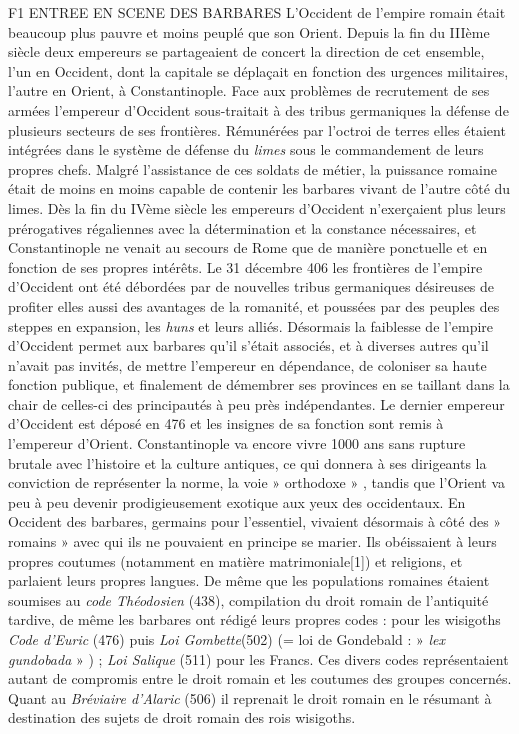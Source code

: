 F1 ENTREE EN SCENE DES BARBARES
 L'Occident de l'empire romain était beaucoup plus pauvre et moins peuplé que son Orient. Depuis la fin du IIIème siècle deux empereurs se partageaient de concert la direction de cet ensemble, l'un en Occident, dont la capitale se déplaçait en fonction des urgences militaires, l'autre en Orient, à Constantinople. 
 Face aux problèmes de recrutement de ses armées l'empereur d'Occident sous-traitait à des tribus germaniques la défense de plusieurs secteurs de ses frontières. Rémunérées par l'octroi de terres elles étaient intégrées dans le système de défense du \emph{limes} sous le commandement de leurs propres chefs. Malgré l'assistance de ces soldats de métier, la puissance romaine était de moins en moins capable de contenir les barbares vivant de l'autre côté du limes. Dès la fin du IVème siècle les empereurs d'Occident n'exerçaient plus leurs prérogatives régaliennes avec la détermination et la constance nécessaires, et Constantinople ne venait au secours de Rome que de manière ponctuelle et en fonction de ses propres intérêts. Le 31 décembre 406 les frontières de l'empire d'Occident ont été débordées par de nouvelles tribus germaniques désireuses de profiter elles aussi des avantages de la romanité, et poussées par des peuples des steppes en expansion, les \emph{huns} et leurs alliés.
 Désormais la faiblesse de l'empire d'Occident permet aux barbares qu'il s'était associés, et à diverses autres qu'il n'avait pas invités, de mettre l'empereur en dépendance, de coloniser sa haute fonction publique, et finalement de démembrer ses provinces en se taillant dans la chair de celles-ci des principautés à peu près indépendantes. Le dernier empereur d'Occident est déposé en 476 et les insignes de sa fonction sont remis à l'empereur d'Orient. 
 Constantinople va encore vivre 1000 ans sans rupture brutale avec l'histoire et la culture antiques, ce qui donnera à ses dirigeants la conviction de représenter la norme, la voie » orthodoxe » , tandis que l'Orient va peu à peu devenir prodigieusement exotique aux yeux des occidentaux.
 En Occident des barbares, germains pour l'essentiel, vivaient désormais à côté des » romains » avec qui ils ne pouvaient en principe se marier. Ils obéissaient à leurs propres coutumes (notamment en matière matrimoniale[1]) et religions, et parlaient leurs propres langues. De même que les populations romaines étaient soumises au \emph{code Théodosien} (438), compilation du droit romain de l'antiquité tardive, de même les barbares ont rédigé leurs propres codes : pour les wisigoths \emph{Code d'Euric} (476) puis \emph{Loi Gombette}(502) (= loi de Gondebald : » \emph{lex gundobada} » ) ; \emph{Loi Salique} (511) pour les Francs. Ces divers codes représentaient autant de compromis entre le droit romain et les coutumes des groupes concernés. Quant au\emph{ Bréviaire d'Alaric} (506) il reprenait le droit romain en le résumant à destination des sujets de droit romain des rois wisigoths.
